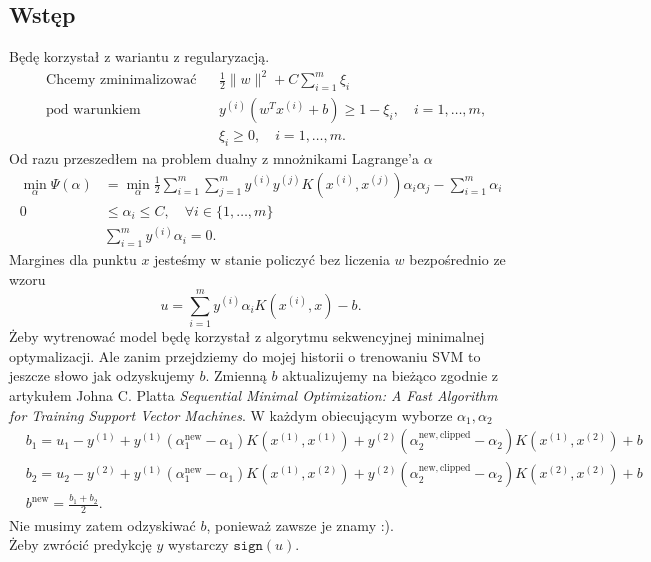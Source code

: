 \documentclass[a4paper,12pt]{article}
\begin{document}
\subsection{Wstęp}
Będę korzystał z wariantu z regularyzacją.
\begin{align*}
    &\text{Chcemy zminimalizować} && \frac{1}{2} \|w\|^2 + C \sum_{i=1}^m \xi_i \\
    &\text{pod warunkiem} && y^{(i)} \left( w^T x^{(i)} + b \right) \geq 1 - \xi_i, \quad i = 1, \ldots, m, \\
    & && \xi_i \geq 0, \quad i = 1, \ldots, m.
\end{align*}
Od razu przeszedłem na problem dualny z mnożnikami Lagrange'a $\alpha$
\begin{align*}
\min_{\alpha} \Psi(\alpha) &= \min_{\alpha} \frac{1}{2} \sum_{i=1}^m \sum_{j=1}^m y^{(i)} y^{(j)} K(x^{(i)}, x^{(j)}) \alpha_i \alpha_j - \sum_{i=1}^m \alpha_i \\
0 &\leq \alpha_i \leq C, \quad \forall i \in \{1,\dots,m\} \\
&\sum_{i=1}^m y^{(i)} \alpha_i = 0.
\end{align*}
Margines dla punktu $x$ jesteśmy w stanie policzyć bez liczenia $w$ bezpośrednio ze wzoru
\[
u = \sum_{i=1}^m y^{(i)}\alpha_i K(x^{(i)}, x) - b.
\]
Żeby wytrenować model będę korzystał z algorytmu sekwencyjnej minimalnej optymalizacji. Ale zanim przejdziemy do mojej historii o trenowaniu SVM to jeszcze słowo jak odzyskujemy $b$.
Zmienną $b$ aktualizujemy na bieżąco zgodnie z artykułem Johna C. Platta \textit{Sequential Minimal Optimization:
A Fast Algorithm for Training Support Vector Machines}. W każdym obiecującym wyborze $\alpha_1, \alpha_2$
\begin{align*}
    &b_1 = u_1 - y^{(1)} + y^{(1)}(\alpha_1^{\mathrm{new}} - \alpha_1)K(x^{(1)}, x^{(1)}) + y^{(2)}(\alpha_2^{\mathrm{new,clipped}} - \alpha_2)K(x^{(1)}, x^{(2)}) + b \\ 
    &b_2 = u_2 - y^{(2)} + y^{(1)}(\alpha_1^{\mathrm{new}} - \alpha_1)K(x^{(1)}, x^{(2)}) + y^{(2)}(\alpha_2^{\mathrm{new,clipped}} - \alpha_2)K(x^{(2)}, x^{(2)}) + b \\ 
    &b^{\mathrm{new}} = \frac{b_1 + b_2}{2}.
\end{align*}
Nie musimy zatem odzyskiwać $b$, ponieważ zawsze je znamy :). \\
Żeby zwrócić predykcję $y$ wystarczy $\texttt{sign}(u)$.
\end{document}

